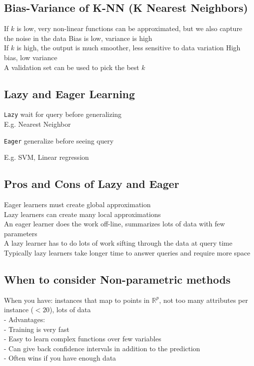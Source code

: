 \documentclass[10pt,landscape,a4paper]{cheatsheet}
\begin{document}
  \subsection{Bias-Variance of K-NN (K Nearest Neighbors)}
  If $k$ is low, very non-linear functions can be approximated, but we also 
  capture the noise in the data Bias is low, variance is high\\

  If $k$ is high, the output is much smoother, less sensitive to data variation
  High bias, low variance\\

  A validation set can be used to pick the best $k$
  
  \subsection{Lazy and Eager Learning}
  \texttt{Lazy} wait for query before generalizing\\
    E.g. Nearest Neighbor

  \texttt{Eager} generalize before seeing query

    E.g. SVM, Linear regression

  \subsection{Pros and Cons of Lazy and Eager}
  Eager learners must create global approximation\\
  Lazy learners can create many local approximations\\
  An eager learner does the work off-line, summarizes lots of data with few parameters\\
  A lazy learner has to do lots of work sifting through the data at query time\\
  Typically lazy learners take longer time to answer queries and require more space\\

  \subsection{When to consider Non-parametric methods}
  When you have: instances that map to points in ${\mathbb R}^p$, 
not too many attributes per instance ($< 20$), lots of data\\

  - Advantages:\\

    -   Training is very fast\\
    -   Easy to learn complex functions over few variables\\
    -   Can give back confidence intervals in addition to the prediction\\
    -   Often wins if you have enough data\\
\end{document}
